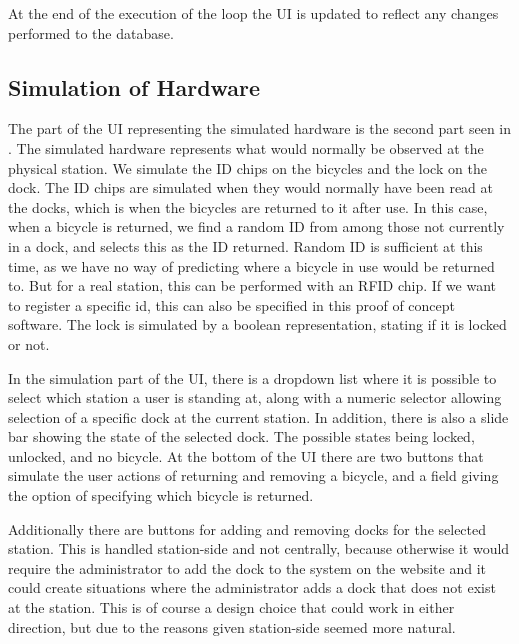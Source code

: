 At the end of the execution of the loop the UI is updated to reflect any changes performed to the database.

\subsection{Simulation of Hardware}
The part of the UI representing the simulated hardware is the second part seen in .
The simulated hardware represents what would normally be observed at the physical station.
We simulate the ID chips on the bicycles and the lock on the dock.
The ID chips are simulated when they would normally have been read at the docks, which is when the bicycles are returned to it after use.
In this case, when a bicycle is returned, we find a random ID from among those not currently in a dock, and selects this as the ID returned.
Random ID is sufficient at this time, as we have no way of predicting where a bicycle in use would be returned to.
But for a real station, this can be performed with an RFID chip.
If we want to register a specific id, this can also be specified in this proof of concept software.
The lock is simulated by a boolean representation, stating if it is locked or not.

In the simulation part of the UI, there is a dropdown list where it is possible to select which station a user is standing at, along with a numeric selector allowing selection of a specific dock at the current station.
In addition, there is also a slide bar showing the state of the selected dock.
The possible states being locked, unlocked, and no bicycle.
At the bottom of the UI there are two buttons that simulate the user actions of returning and removing a bicycle, and a field giving the option of specifying which bicycle is returned.

Additionally there are buttons for adding and removing docks for the selected station. 
This is handled station-side and not centrally, because otherwise it would require the administrator to add the dock to the system on the website and it could create situations where the administrator adds a dock that does not exist at the station.  
This is of course a design choice that could work in either direction, but due to the reasons given station-side seemed more natural.